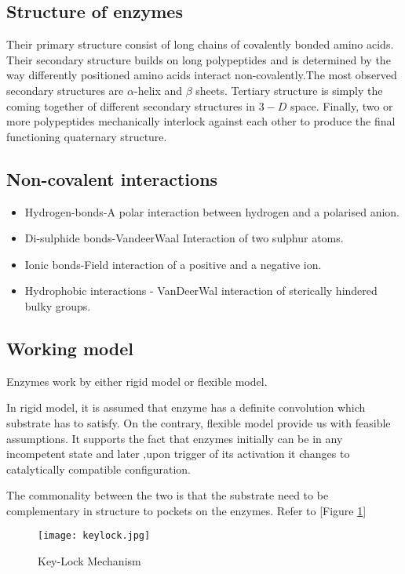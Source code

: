 \documentclass[12pt]{article}
\begin{document}
\subsection{Structure of enzymes}
Their primary structure consist of long chains of covalently bonded amino acids. Their secondary structure builds on long polypeptides and is determined by the way differently positioned amino acids interact non-covalently.The most observed secondary structures are $\alpha$-helix and $\beta$ sheets. Tertiary structure is simply the coming together of different secondary structures in $3-D$ space.
Finally, two or more polypeptides mechanically interlock against each other to produce the final functioning quaternary structure.

\subsection{Non-covalent interactions}
\begin{itemize}
\item Hydrogen-bonds-A polar interaction between hydrogen and a polarised anion.
\item Di-sulphide bonds-VandeerWaal Interaction of two sulphur atoms.
\item Ionic bonds-Field interaction of a positive and a negative ion.
\item Hydrophobic interactions - VanDeerWal interaction of sterically hindered bulky groups.
\end{itemize}
\newpage
\subsection{Working model}
Enzymes work by either rigid model or flexible model.

 In rigid model, it is assumed that enzyme has a definite convolution which substrate has to satisfy. On the contrary, flexible model provide us with feasible assumptions. It supports the fact that enzymes initially can be in any incompetent state and later ,upon trigger of its activation it changes to catalytically compatible configuration.

The commonality between the two is that the substrate need to be complementary in structure to pockets on the enzymes. Refer to [Figure \ref{fig key lock}]
\vfill
\begin{figure}[h]
\centering
\texttt{[image: keylock.jpg]}
\caption{Key-Lock Mechanism}
\label{fig key lock}

\end{figure}
\end{document}
